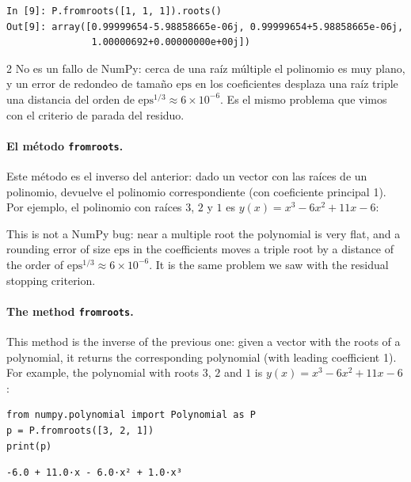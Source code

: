 \begin{verbatim}
In [9]: P.fromroots([1, 1, 1]).roots()
Out[9]: array([0.99999654-5.98858665e-06j, 0.99999654+5.98858665e-06j,
               1.00000692+0.00000000e+00j])
\end{verbatim}
\begin{paracol}{2}
No es un fallo de NumPy: cerca de una raíz múltiple el polinomio es muy plano, y un error de redondeo de tamaño $\text{eps}$ en los coeficientes desplaza una raíz triple una distancia del orden de $\text{eps}^{1/3}\approx6\times10^{-6}$. Es el mismo problema que vimos con el criterio de parada del residuo.

\paragraph{El método \texttt{fromroots}.} Este método es el inverso del anterior: dado un vector con las raíces de un polinomio, devuelve el polinomio correspondiente (con coeficiente principal 1). Por ejemplo, el polinomio con raíces $3$, $2$ y $1$ es $y(x)=x^3-6x^2+11x-6$:

\switchcolumn
This is not a NumPy bug: near a multiple root the polynomial is very flat, and a rounding error of size $\text{eps}$ in the coefficients moves a triple root by a distance of the order of $\text{eps}^{1/3}\approx6\times10^{-6}$. It is the same problem we saw with the residual stopping criterion.

\paragraph{The method \texttt{fromroots}.} This method is the inverse of the previous one: given a vector with the roots of a polynomial, it returns the corresponding polynomial (with leading coefficient 1). For example, the polynomial with roots $3$, $2$ and $1$ is $y(x)=x^3-6x^2+11x-6$:

\end{paracol}
\begin{verbatim}
from numpy.polynomial import Polynomial as P
p = P.fromroots([3, 2, 1])
print(p)
\end{verbatim}
\begin{verbatim}
-6.0 + 11.0·x - 6.0·x² + 1.0·x³
\end{verbatim}

